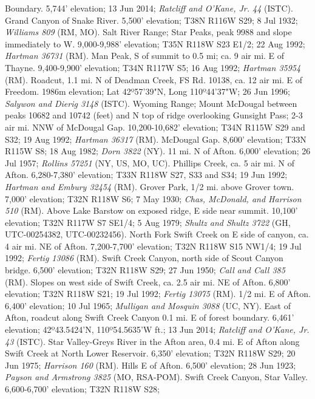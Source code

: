 Boundary. 5,744' elevation; 13 Jun 2014;
\textit{Ratcliff and O'Kane, Jr. 44} (ISTC).
Grand Canyon of Snake River. 5,500' elevation; T38N R116W S29; 8 Jul 1932;
\textit{Williams 809} (RM, MO).
Salt River Range; Star Peaks, peak 9988 and slope immediately to W.
9,000-9,988' elevation; T35N R118W S23 E1/2; 22 Aug 1992;
\textit{Hartman 36731} (RM).
Man Peak, S of summit to 0.5 mi; ca. 9 air mi. E of Thayne.
9,400-9,900' elevation; T34N R117W S5; 16 Aug 1992; \textit{Hartman 35954} (RM).
Roadcut, 1.1 mi. N of Deadman Creek, FS Rd. 10138, ca. 12 air mi. E of Freedom.
1986m elevation; Lat 42º57'39"N, Long 110º44'37"W; 26 Jun 1996;
\textit{Salywon and Dierig 3148} (ISTC).
Wyoming Range; Mount McDougal between peaks 10682 and 10742 (feet) and N top of
ridge overlooking Gunsight Pass; 2-3 air mi. NNW of McDougal Gap. 10,200-10,682'
elevation; T34N R115W S29 and S32; 19 Aug 1992; \textit{Hartman 36317} (RM).
McDougal Gap. 8,600' elevation; T33N R115W S8; 18 Aug 1982;
\textit{Dorn 3822} (NY).
11 mi. N of Afton. 6,000' elevation; 26 Jul 1957;
\textit{Rollins 57251} (NY, US, MO, UC).
Phillips Creek, ca. 5 air mi. N of Afton. 6,280-7,380' elevation;
T33N R118W S27, S33 and S34; 19 Jun 1992;
\textit{Hartman and Embury 32454} (RM).
Grover Park, 1/2 mi. above Grover town. 7,000' elevation; T32N R118W S6;
7 May 1930; \textit{Chas, McDonald, and Harrison 510} (RM).
Above Lake Barstow on exposed ridge, E side near summit.
10,100' elevation; T32N R117W S7 SE1/4; 5 Aug 1979;
\textit{Shultz and Shultz 3722} (GH, UTC-00254382, UTC-00232456).
North Fork Swift Creek on E side of canyon, ca. 4 air mi. NE of Afton.
7,200-7,700' elevation; T32N R118W S15 NW1/4; 19 Jul 1992;
\textit{Fertig 13086} (RM).
Swift Creek Canyon, north side of Scout Canyon bridge.
6,500' elevation; T32N R118W S29; 27 Jun 1950; \textit{Call and Call 385} (RM).
Slopes on west side of Swift Creek, ca. 2.5 air mi. NE of Afton.
6,800' elevation; T32N R118W S21; 19 Jul 1992; \textit{Fertig 13075} (RM).
1/2 mi. E of Afton. 6,400' elevation; 10 Jul 1965;
\textit{Mulligan and Mosquin 3088} (UC, NY).
East of Afton, roadcut along Swift Creek Canyon 0.1 mi. E of forest boundary.
6,461' elevation; 42º43.5424'N, 110º54.5635'W  ft.;
13 Jun 2014; \textit{Ratcliff and O'Kane, Jr. 43} (ISTC).
Star Valley-Greys River in the Afton area, 0.4 mi. E of Afton along Swift Creek
at North Lower Reservoir. 6,350' elevation; T32N R118W S29; 20 Jun 1975;
\textit{Harrison 160} (RM).
Hills E of Afton. 6,500' elevation; 28 Jun 1923;
\textit{Payson and Armstrong 3825} (MO, RSA-POM).
Swift Creek Canyon, Star Valley. 6,600-6,700' elevation; T32N R118W S28;
